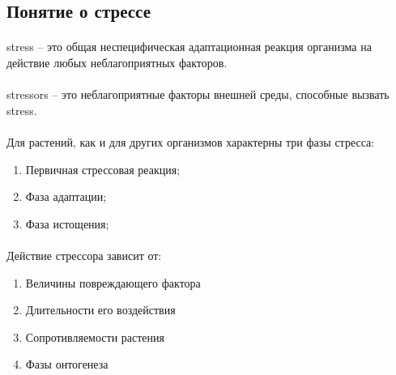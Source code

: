 \subsection*{Понятие о стрессе}


\paragraph*{}\gls{stress} -- это общая неспецифическая адаптационная реакция организма на действие любых неблагоприятных факторов. 

\paragraph*{}\gls{stressors} -- это неблагоприятные факторы внешней среды, способные вызвать \gls{stress}.  


\paragraph*{}Для растений, как и для других организмов характерны три фазы стресса: 

\begin{enumerate}
	\item Первичная стрессовая реакция;
	\item Фаза адаптации;
	\item Фаза истощения;
\end{enumerate}

\paragraph*{}Действие стрессора зависит от:

\begin{enumerate}
	\item Величины  повреждающего фактора
	\item Длительности его воздействия 
	\item Сопротивляемости растения
	\item Фазы онтогенеза
\end{enumerate}

\paragraph*{}

